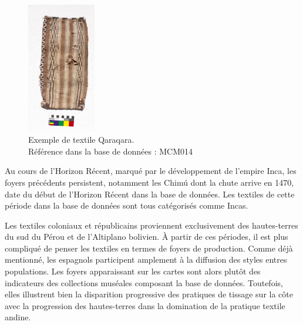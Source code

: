 \begin{figure}
	\begin{center}
		\includegraphics[width=3cm, angle=-90]{../images/MCM014.jpg}
		\caption{Exemple de textile Qaraqara.\\ Référence dans la base de données : MCM014}
		\label{fig:MCM014}
	 \end{center}
\end{figure}

Au cours de l'Horizon Récent, marqué par le développement de l'empire Inca, les foyers précédents persistent, notamment les Chimú dont la chute arrive en 1470, date du début de l'Horizon Récent dans la base de données. Les textiles de cette période dans la base de données sont tous catégorisés comme Incas. 

Les textiles coloniaux et républicains proviennent exclusivement des hautes-terres du sud du Pérou et de l'Altiplano bolivien. À partir de ces périodes, il est plus compliqué de penser les textiles en termes de foyers de production. Comme déjà mentionné, les espagnols participent amplement à la diffusion des styles entres populations. Les foyers apparaissant sur les cartes sont alors plutôt des indicateurs des collections muséales composant la base de données. Toutefois, elles illustrent bien la disparition progressive des pratiques de tissage sur la côte avec la progression des hautes-terres dans la domination de la pratique textile andine. \clearpage


